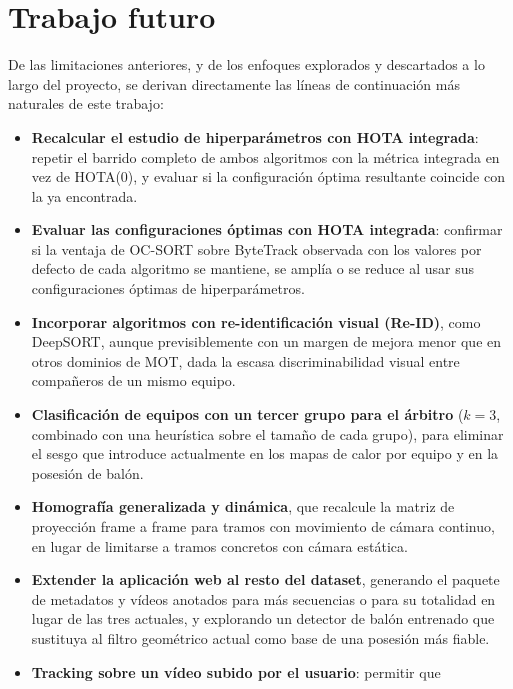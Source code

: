 \section{Trabajo futuro}
\label{sec:conclusiones-futuro}

De las limitaciones anteriores, y de los enfoques explorados y descartados
a lo largo del proyecto, se
derivan directamente las líneas de continuación más naturales de este
trabajo:

\begin{itemize}
  \item \textbf{Recalcular el estudio de hiperparámetros con HOTA
        integrada}: repetir el barrido completo de ambos algoritmos
        con la métrica integrada en
        vez de HOTA(0), y evaluar si la configuración óptima resultante
        coincide con la ya encontrada.
  \item \textbf{Evaluar las configuraciones óptimas con HOTA integrada}:
        confirmar si la ventaja de OC-SORT sobre ByteTrack observada con
        los valores por defecto de cada algoritmo se mantiene, se amplía o
        se reduce al usar sus configuraciones óptimas de hiperparámetros.
  \item \textbf{Incorporar algoritmos con re-identificación visual
        (Re-ID)}, como DeepSORT,
        aunque previsiblemente con un margen de mejora menor que en otros
        dominios de MOT, dada la escasa discriminabilidad visual entre
        compañeros de un mismo equipo.
  \item \textbf{Clasificación de equipos con un tercer grupo para el
        árbitro} ($k=3$, combinado con una heurística sobre el tamaño de
        cada grupo), para eliminar el sesgo que introduce actualmente en
        los mapas de calor por equipo y en la posesión de balón.
  \item \textbf{Homografía generalizada y dinámica}, que recalcule la
        matriz de proyección frame a frame para tramos con movimiento de
        cámara continuo, en lugar de limitarse a tramos concretos con
        cámara estática.
  \item \textbf{Extender la aplicación web al resto del dataset}, generando
        el paquete de metadatos y vídeos anotados para más secuencias o
        para su totalidad en lugar de las tres actuales, y explorando un
        detector de balón entrenado que sustituya al filtro geométrico
        actual como base de una posesión más fiable.
  \item \textbf{Tracking sobre un vídeo subido por el usuario}: permitir que

\end{itemize}
